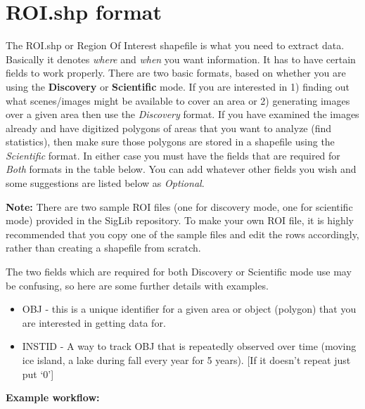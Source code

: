 \documentclass[letterpaper,10pt,openany,oneside]{sphinxmanual}
\begin{document}
\chapter{ROI.shp format}
\label{wiki:roi-shp-format}
The ROI.shp or Region Of Interest shapefile is what you need to extract
data. Basically it denotes \emph{where} and \emph{when} you want information. It
has to have certain fields to work properly. There are two basic
formats, based on whether you are using the \textbf{Discovery} or
\textbf{Scientific} mode. If you are interested in 1) finding out what
scenes/images might be available to cover an area or 2) generating
images over a given area then use the \emph{Discovery} format. If you have
examined the images already and have digitized polygons of areas that
you want to analyze (find statistics), then make sure those polygons are
stored in a shapefile using the \emph{Scientific} format. In either case you
must have the fields that are required for \emph{Both} formats in the table
below. You can add whatever other fields you wish and some suggestions
are listed below as \emph{Optional}.

\textbf{Note:} There are two sample ROI files (one for discovery mode, one
for scientific mode) provided in the SigLib repository. To make your own
ROI file, it is highly recommended that you copy one of the sample files
and edit the rows accordingly, rather than creating a shapefile from
scratch.

The two fields which are required for both Discovery or Scientific mode
use may be confusing, so here are some further details with examples.
\begin{itemize}
\item {} 
OBJ - this is a unique identifier for a given area or object
(polygon) that you are interested in getting data for.

\item {} 
INSTID - A way to track OBJ that is repeatedly observed over time
(moving ice island, a lake during fall every year for 5 years). {[}If
it doesn't repeat just put `0'{]}

\end{itemize}

\textbf{Example workflow:}
\end{document}
